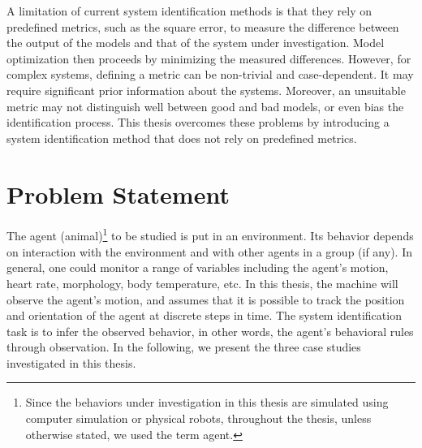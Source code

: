 A limitation of current system identification methods is that they rely on predefined metrics, such as the square error, to measure the difference between the output of the models and that of the system under investigation. Model optimization then proceeds by minimizing the measured differences. However, for complex systems, defining a metric can be non-trivial and case-dependent. It may require significant prior information about the systems. Moreover, an unsuitable metric may not distinguish well between good and bad models, or even bias the identification process. This thesis overcomes these problems by introducing a system identification method that does not rely on predefined metrics.


\section{Problem Statement}

The agent (animal)\footnote{Since the behaviors under investigation in this thesis are simulated using computer simulation or physical robots, throughout the thesis, unless otherwise stated, we used the term agent.} to be studied is put in an environment. Its behavior depends on interaction with the environment and with other agents in a group (if any). In general, one could monitor a range of variables including the agent's motion, heart rate, morphology, body temperature, etc. In this thesis, the machine will observe the agent's motion, and assumes that it is possible to track the position and orientation of the agent at discrete steps in time. The system identification task is to infer the observed behavior, in other words, the agent's behavioral rules through observation. In the following, we present the three case studies investigated in this thesis.

